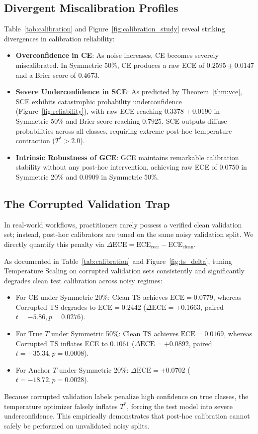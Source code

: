 \documentclass[10pt,twocolumn]{article}
\theoremstyle{definition}
\begin{document}
\subsection{Divergent Miscalibration Profiles}
Table~\ref{tab:calibration} and Figure~\ref{fig:calibration_study} reveal striking divergences in calibration reliability:
\begin{itemize}
    \item \textbf{Overconfidence in CE}: As noise increases, CE becomes severely miscalibrated. In Symmetric 50\%, CE produces a raw ECE of $0.2595 \pm 0.0147$ and a Brier score of $0.4673$.
    \item \textbf{Severe Underconfidence in SCE}: As predicted by Theorem~\ref{thm:vce}, SCE exhibits catastrophic probability underconfidence (Figure~\ref{fig:reliability}), with raw ECE reaching $0.3378 \pm 0.0190$ in Symmetric 50\% and Brier score reaching $0.7925$. SCE outputs diffuse probabilities across all classes, requiring extreme post-hoc temperature contraction ($T^* > 2.0$).
    \item \textbf{Intrinsic Robustness of GCE}: GCE maintains remarkable calibration stability without any post-hoc intervention, achieving raw ECE of $0.0750$ in Symmetric 20\% and $0.0909$ in Symmetric 50\%.
\end{itemize}

\subsection{The Corrupted Validation Trap}
In real-world workflows, practitioners rarely possess a verified clean validation set; instead, post-hoc calibrators are tuned on the same noisy validation split. We directly quantify this penalty via $\Delta \text{ECE} = \text{ECE}_{\text{corr}} - \text{ECE}_{\text{clean}}$.

As documented in Table~\ref{tab:calibration} and Figure~\ref{fig:ts_delta}, tuning Temperature Scaling on corrupted validation sets consistently and significantly degrades clean test calibration across noisy regimes:
\begin{itemize}
    \item For CE under Symmetric 20\%: Clean TS achieves $\text{ECE} = 0.0779$, whereas Corrupted TS degrades to $\text{ECE} = 0.2442$ ($\Delta \text{ECE} = +0.1663$, paired $t = -5.86, p = 0.0276$).
    \item For True $T$ under Symmetric 50\%: Clean TS achieves $\text{ECE} = 0.0169$, whereas Corrupted TS inflates ECE to $0.1061$ ($\Delta \text{ECE} = +0.0892$, paired $t = -35.34, p = 0.0008$).
    \item For Anchor $T$ under Symmetric 20\%: $\Delta \text{ECE} = +0.0702$ ($t = -18.72, p = 0.0028$).
\end{itemize}
Because corrupted validation labels penalize high confidence on true classes, the temperature optimizer falsely inflates $T^*$, forcing the test model into severe underconfidence. This empirically demonstrates that post-hoc calibration cannot safely be performed on unvalidated noisy splits.
\end{document}
